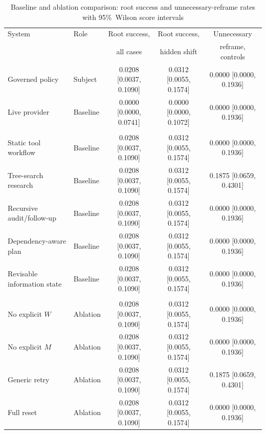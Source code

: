 
\begin{table}[t]
  \centering
  \caption{Baseline and ablation comparison: root success and unnecessary-reframe rates with 95\%~Wilson score intervals}
  \label{tab:P1-T2}
  \scriptsize
  \setlength{\tabcolsep}{3pt}
  \begin{tabular}{>{\raggedright\arraybackslash}p{3.05cm}lccc}
    \toprule
    System & Role & Root success, & Root success, & Unnecessary \\
    & & all cases & hidden shift & reframe, controls \\
    \midrule
    Governed policy & Subject & 0.0208 [0.0037, 0.1090] & 0.0312 [0.0055, 0.1574] & 0.0000 [0.0000, 0.1936] \\
    Live provider & Baseline & 0.0000 [0.0000, 0.0741] & 0.0000 [0.0000, 0.1072] & 0.0000 [0.0000, 0.1936] \\
    \addlinespace
    \multicolumn{5}{l}{\textit{Baselines}} \\
    Static tool workflow & Baseline & 0.0208 [0.0037, 0.1090] & 0.0312 [0.0055, 0.1574] & 0.0000 [0.0000, 0.1936] \\
    Tree-search research & Baseline & 0.0208 [0.0037, 0.1090] & 0.0312 [0.0055, 0.1574] & 0.1875 [0.0659, 0.4301] \\
    Recursive audit/follow-up & Baseline & 0.0208 [0.0037, 0.1090] & 0.0312 [0.0055, 0.1574] & 0.0000 [0.0000, 0.1936] \\
    Dependency-aware plan & Baseline & 0.0208 [0.0037, 0.1090] & 0.0312 [0.0055, 0.1574] & 0.0000 [0.0000, 0.1936] \\
    Revisable information state & Baseline & 0.0208 [0.0037, 0.1090] & 0.0312 [0.0055, 0.1574] & 0.0000 [0.0000, 0.1936] \\
    \addlinespace
    \multicolumn{5}{l}{\textit{Ablations}} \\
    No explicit $W$ & Ablation & 0.0208 [0.0037, 0.1090] & 0.0312 [0.0055, 0.1574] & 0.0000 [0.0000, 0.1936] \\
    No explicit $M$ & Ablation & 0.0208 [0.0037, 0.1090] & 0.0312 [0.0055, 0.1574] & 0.0000 [0.0000, 0.1936] \\
    Generic retry & Ablation & 0.0208 [0.0037, 0.1090] & 0.0312 [0.0055, 0.1574] & 0.1875 [0.0659, 0.4301] \\
    Full reset & Ablation & 0.0208 [0.0037, 0.1090] & 0.0312 [0.0055, 0.1574] & 0.0000 [0.0000, 0.1936] \\

\end{tabular}
\end{table}
